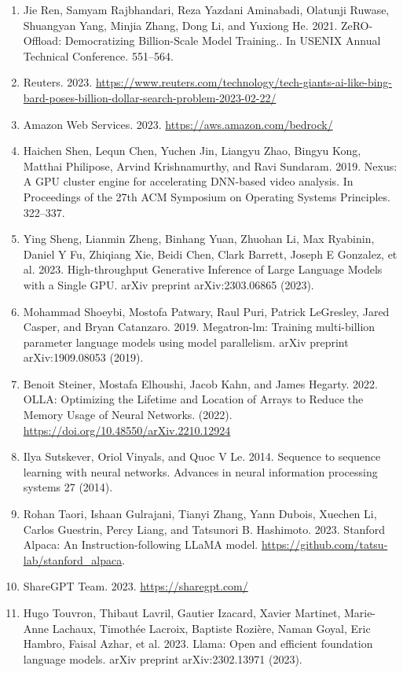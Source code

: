 \documentclass[11pt,UTF8,fontset=fandol]{ctexart}
\begin{document}
\begin{enumerate}[leftmargin=2.2em,labelsep=0.6em,itemsep=0.25em]
\item Jie Ren, Samyam Rajbhandari, Reza Yazdani Aminabadi, Olatunji Ruwase, Shuangyan Yang, Minjia Zhang, Dong Li, and Yuxiong He. 2021. ZeRO-Offload: Democratizing Billion-Scale Model Training.. In USENIX Annual Technical Conference. 551--564.
\item Reuters. 2023. \url{https://www.reuters.com/technology/tech-giants-ai-like-bing-bard-poses-billion-dollar-search-problem-2023-02-22/}
\item Amazon Web Services. 2023. \url{https://aws.amazon.com/bedrock/}
\item Haichen Shen, Lequn Chen, Yuchen Jin, Liangyu Zhao, Bingyu Kong, Matthai Philipose, Arvind Krishnamurthy, and Ravi Sundaram. 2019. Nexus: A GPU cluster engine for accelerating DNN-based video analysis. In Proceedings of the 27th ACM Symposium on Operating Systems Principles. 322--337.
\item Ying Sheng, Lianmin Zheng, Binhang Yuan, Zhuohan Li, Max Ryabinin, Daniel Y Fu, Zhiqiang Xie, Beidi Chen, Clark Barrett, Joseph E Gonzalez, et al. 2023. High-throughput Generative Inference of Large Language Models with a Single GPU. arXiv preprint arXiv:2303.06865 (2023).
\item Mohammad Shoeybi, Mostofa Patwary, Raul Puri, Patrick LeGresley, Jared Casper, and Bryan Catanzaro. 2019. Megatron-lm: Training multi-billion parameter language models using model parallelism. arXiv preprint arXiv:1909.08053 (2019).
\item Benoit Steiner, Mostafa Elhoushi, Jacob Kahn, and James Hegarty. 2022. OLLA: Optimizing the Lifetime and Location of Arrays to Reduce the Memory Usage of Neural Networks. (2022). \url{https://doi.org/10.48550/arXiv.2210.12924}
\item Ilya Sutskever, Oriol Vinyals, and Quoc V Le. 2014. Sequence to sequence learning with neural networks. Advances in neural information processing systems 27 (2014).
\item Rohan Taori, Ishaan Gulrajani, Tianyi Zhang, Yann Dubois, Xuechen Li, Carlos Guestrin, Percy Liang, and Tatsunori B. Hashimoto. 2023. Stanford Alpaca: An Instruction-following LLaMA model. \url{https://github.com/tatsu-lab/stanford_alpaca}.
\item ShareGPT Team. 2023. \url{https://sharegpt.com/}
\item Hugo Touvron, Thibaut Lavril, Gautier Izacard, Xavier Martinet, Marie-Anne Lachaux, Timothée Lacroix, Baptiste Rozière, Naman Goyal, Eric Hambro, Faisal Azhar, et al. 2023. Llama: Open and efficient foundation language models. arXiv preprint arXiv:2302.13971 (2023).

\end{enumerate}
\end{document}
